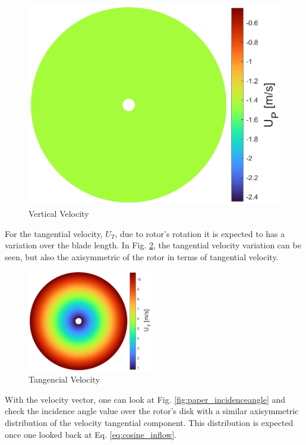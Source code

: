 {\begin{figure}[!htb]
\begin{minipage}{.49\textwidth}
      \includegraphics[width=\textwidth]{Figures/comp_method/sim_B/U_P.eps}
      \caption[Vertical Velocity]{Vertical Velocity}
      \label{fig:imagem3}
    \end{minipage}
\end{figure}

For the tangential velocity, $U_T$, due to rotor's rotation it is expected to has a variation over the blade length. In Fig. \ref{fig:tangencial velocity}, the tangential velocity variation can be seen, but also the axisymmetric of the rotor in terms of tangential velocity.


\begin{figure}[!htb]
    \centering
    \includegraphics[width=0.49\textwidth]{Figures/comp_method/sim_B/U_T.eps}
    \caption[Tangencial Velocity]{Tangencial Velocity}
    \label{fig:tangencial velocity}
\end{figure}

With the velocity vector, one can look at Fig. \ref{fig:paper_incidenceangle} and check the incidence angle value over the rotor's disk with a similar axisymmetric distribution of the velocity tangential component. This distribution is expected once one looked back at Eq. \ref{eq:cosine_inflow}.

}
